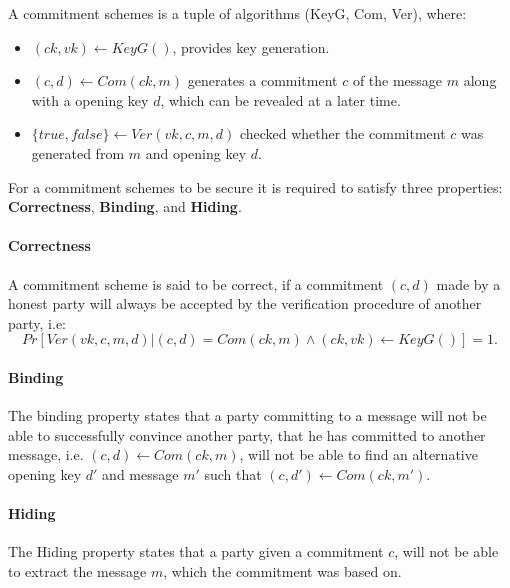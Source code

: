 \begin{definition}
A commitment schemes is a tuple of algorithms (KeyG, Com, Ver), where:
\begin{itemize}
  \item $(ck, vk) \leftarrow KeyG()$, provides key generation.
  \item $(c, d) \leftarrow Com(ck, m)$ generates a commitment $c$ of the message
    $m$ along with a opening key $d$, which can be revealed at a later time.
  \item $\{true, false\} \leftarrow Ver(vk, c, m, d)$ checked whether the
    commitment $c$ was generated from $m$ and opening key $d$.
\end{itemize}
\end{definition}

For a commitment schemes to be secure it is required to satisfy three
properties: \textbf{Correctness}, \textbf{Binding}, and \textbf{Hiding}.

\paragraph{Correctness}
A commitment scheme is said to be correct, if a commitment $(c, d)$ made by a
honest party will always be accepted by the verification procedure of another
party, i.e:
$$
Pr[Ver(vk, c, m, d) | (c, d) = Com(ck, m) \land (ck, vk) \leftarrow KeyG()] = 1.
$$

\paragraph{Binding}
The binding property states that a party committing to a message will not be
able to successfully convince another party, that he has committed to another
message, i.e. $(c, d) \leftarrow Com(ck, m)$, will not be able to find an alternative opening key $d'$
and message $m'$ such that $(c, d') \leftarrow Com(ck, m')$.




\paragraph{Hiding}
The Hiding property states that a party given a commitment $c$, will not be able
to extract the message $m$, which the commitment was based on.


